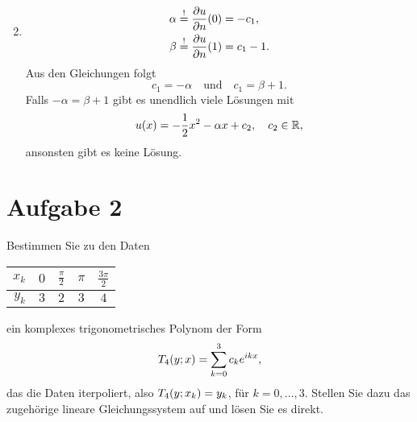 \documentclass{exercise}
\begin{document}
\begin{enumerate}
\[        \]
        \item
        \begin{align*}
            \alpha &\stackrel{!}{=} \frac{\partial u}{\partial n}\parentheses*{0} = -c_1,\\
            \beta &\stackrel{!}{=} \frac{\partial u}{\partial n}\parentheses*{1} = c_1 - 1.
        \end{align*}
        Aus den Gleichungen folgt
        \[
            c_1 = -\alpha \quad \text{und} \quad c_1 = \beta + 1.
        \]
        Falls \(-\alpha = \beta + 1\) gibt es unendlich viele Lösungen mit
        \[
            u\parentheses*{x} = -\frac{1}{2}x^2 - \alpha x + c_2, \quad c_2 \in \R,
        \]
        ansonsten gibt es keine Lösung.
    \end{enumerate}


    \section*{Aufgabe 2}

    \begin{problem}
        Bestimmen Sie zu den Daten
        \begin{center}
            \begin{tabular}{rcccc}
                \toprule
                \(x_k\) & \(0\) & \(\frac{\pi}{2}\) & \(\pi\) & \(\frac{3\pi}{2}\)\\
                \midrule
                \(y_k\) & \(3\) & \(2\) & \(3\) & \(4\)\\
                \bottomrule
            \end{tabular}
        \end{center}
        ein komplexes trigonometrisches Polynom der Form
        \[
            T_4\parentheses*{y; x} = \sum_{k = 0}^3 c_k e^{ikx},
        \]
        das die Daten iterpoliert, also \(T_4\parentheses*{y; x_k} = y_k\), für \(k = 0, \ldots, 3\).
        Stellen Sie dazu das zugehörige lineare Gleichungssystem auf und lösen Sie es direkt.
    \end{problem}
\end{document}
